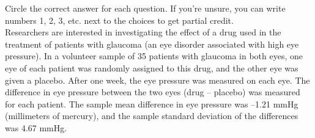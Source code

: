 \documentclass{article}
\begin{document}
	Circle the correct answer for each question.  If you're unsure, you can write numbers 1, 2, 3, etc. next to the choices to get partial credit.\\[.5cm]
	
	Researchers are interested in investigating the effect of a drug used in the treatment of patients with glaucoma (an eye disorder associated with high eye pressure). In a volunteer sample of 35 patients with glaucoma in both eyes, one eye of each patient was randomly assigned to this drug, and the other eye was given a placebo. After one week, the eye pressure was measured on each eye. The difference in eye pressure between the two eyes (drug – placebo) was measured for each patient. The sample mean difference in eye pressure was –1.21 mmHg (millimeters of mercury), and the sample standard deviation of the differences was 4.67 mmHg.
\end{document}
